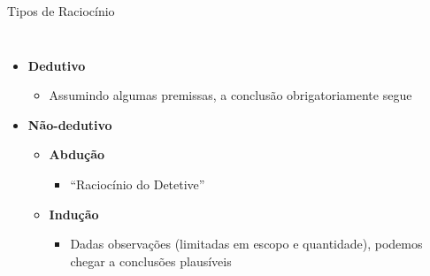 \documentclass[aspectratio=169,xcolor=dvipsnames]{beamer}
\begin{document}
\begin{frame}{Tipos de Raciocínio}
\begin{columns}
        \begin{itemize}
            \item<1-> \textbf{Dedutivo}
            \begin{itemize}
                \item Assumindo algumas premissas, a conclusão obrigatoriamente segue
            \end{itemize}
            \item<2-> \textbf{Não-dedutivo}
            \begin{itemize}
                \item<2-> \textbf{Abdução}
                \begin{itemize}
                    \item “Raciocínio do Detetive”
                \end{itemize}
                \item<3-> \textbf{Indução}
                \begin{itemize}
                    \item Dadas observações (limitadas em escopo e quantidade), podemos chegar a conclusões plausíveis
                \end{itemize}
            \end{itemize}
        \end{itemize}
        

\end{columns}
\end{frame}
\end{document}
